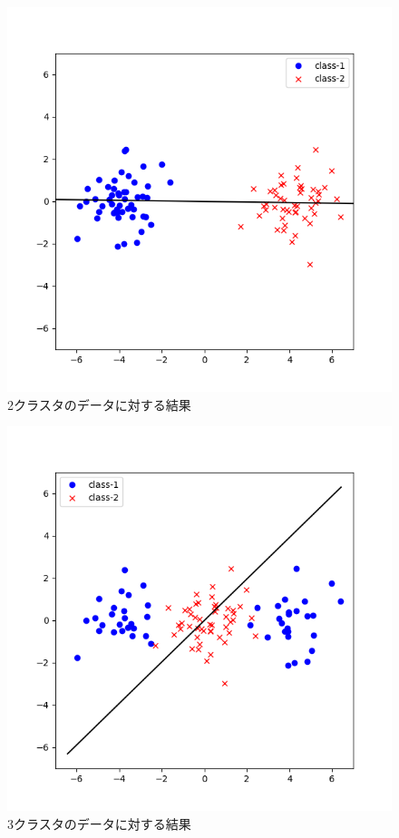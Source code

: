 \documentclass[class=jsarticle, crop=false, dvipdfmx, fleqn]{standalone}
\begin{document}
\begin{figure}[H]
    \centering
    \includegraphics[clip, width=12cm]{../figures/assignment1_result_two_cluster}
    \caption{2クラスタのデータに対する結果}
    \label{fig:result_2cluster}
\end{figure}

\begin{figure}[H]
    \centering
    \includegraphics[clip, width=12cm]{../figures/assignment1_result_three_cluster}
    \caption{3クラスタのデータに対する結果}
    \label{fig:result_3cluster}
\end{figure}
\end{document}
